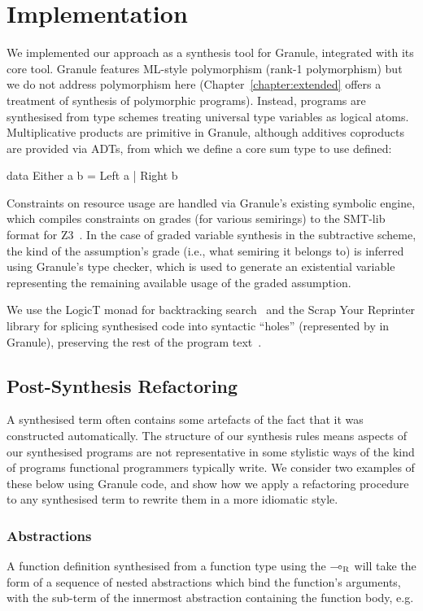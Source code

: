 \section{Implementation}
We implemented our approach as a synthesis tool for Granule, integrated with its
core tool. Granule features ML-style polymorphism (rank-1 polymorphism) but we
do not address polymorphism here (Chapter~\ref{chapter:extended} offers a treatment of 
synthesis of polymorphic programs). Instead, programs are synthesised from type
schemes treating universal type variables as logical atoms. Multiplicative
products are primitive in Granule, although additives coproducts are provided
via ADTs, from which we define a core sum type to use defined: 
\begin{granule}
  data Either a b
    = Left a 
    | Right b
\end{granule}
Constraints on resource usage are handled via Granule's existing
symbolic engine, which compiles constraints on grades (for various semirings)
to the SMT-lib format for Z3~\citep{z3}.
In the case of graded variable synthesis in the subtractive
scheme, the kind of the assumption's grade (i.e., what semiring it
belongs to) is inferred using Granule's type
checker, which is used to generate an existential variable representing
the remaining available usage of the graded assumption.

We use the LogicT monad for backtracking search~\citep{logict} and the Scrap
Your Reprinter library for splicing synthesised code into syntactic ``holes''
(represented by  in Granule), preserving the rest of the program
text~\citep{clarke2017scrap}.

\subsection{Post-Synthesis Refactoring}
\label{sec:linear-base-refactoring}
A synthesised term often contains some artefacts of the fact that it was
constructed automatically. The structure of our synthesis rules means aspects of
our synthesised programs are not representative in some stylistic ways of the
kind of programs functional programmers typically write. We consider two
examples of these below using Granule code, and show how we apply a refactoring
procedure to any synthesised term to rewrite them in a more idiomatic style. 

\subsubsection{Abstractions}
A function definition synthesised from a function type using the
$\multimap_{\textsc{R}}$ will take the form of a sequence of nested abstractions which
bind the function's arguments, with the sub-term of the innermost abstraction
containing the function body, e.g.

